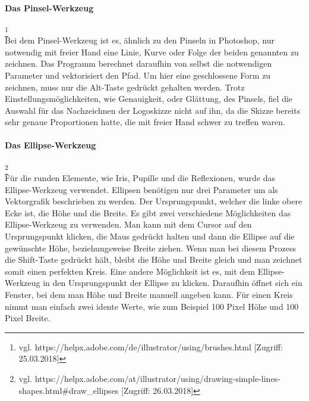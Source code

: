 \paragraph{Das Pinsel-Werkzeug}
\footnote{\label{} vgl. https://helpx.adobe.com/de/illustrator/using/brushes.html [Zugriff: 25.03.2018]}
\leavevmode \\
Bei dem Pinsel-Werkzeug ist es, ähnlich zu den Pinseln in Photoshop, nur notwendig mit freier Hand eine Linie, Kurve oder Folge der beiden genannten zu zeichnen. Das Programm berechnet daraufhin von selbst die notwendigen Parameter und vektorisiert den Pfad. Um hier eine geschlossene Form zu zeichnen, muss nur die Alt-Taste gedrückt gehalten werden. Trotz Einstellungsmöglichkeiten, wie Genauigkeit, oder Glättung, des Pinsels, fiel die Auswahl für das Nachzeichnen der Logoskizze nicht auf ihn, da die Skizze bereits sehr genaue Proportionen hatte, die mit freier Hand schwer zu treffen waren.
\leavevmode \\

\paragraph{Das Ellipse-Werkzeug}
\footnote{\label{} vgl. https://helpx.adobe.com/at/illustrator/using/drawing-simple-lines-shapes.html\#draw\_ellipses [Zugriff: 26.03.2018]}
\leavevmode \\
Für die runden Elemente, wie Iris, Pupille und die Reflexionen, wurde das Ellipse-Werkzeug verwendet. Ellipsen benötigen nur drei Parameter um als Vektorgrafik beschrieben zu werden. Der Ursprungspunkt, welcher die linke obere Ecke ist, die Höhe und die Breite. Es gibt zwei verschiedene Möglichkeiten das Ellipse-Werkzeug zu verwenden. Man kann mit dem Cursor auf den Ursprungspunkt klicken, die Maus gedrückt halten und dann die Ellipse auf die gewünschte Höhe, beziehungsweise Breite ziehen. Wenn man bei diesem Prozess die Shift-Taste gedrückt hält, bleibt die Höhe und Breite gleich und man zeichnet somit einen perfekten Kreis. Eine andere Möglichkeit ist es, mit dem Ellipse-Werkzeug in den Ursprungspunkt der Ellipse zu klicken. Daraufhin öffnet sich ein Fenster, bei dem man Höhe und Breite manuell angeben kann. Für einen Kreis nimmt man einfach zwei idente Werte, wie zum Beispiel 100 Pixel Höhe und 100 Pixel Breite.
\leavevmode \\


